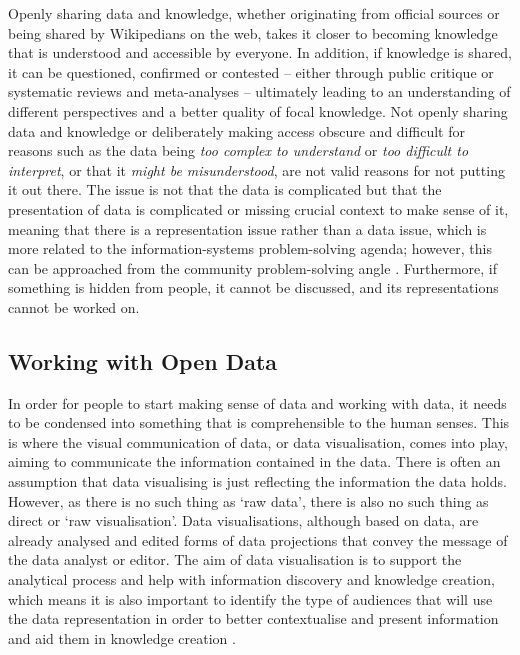 \noindent
Openly sharing data and knowledge, whether originating from official sources or being shared by Wikipedians on the web, takes it closer to becoming knowledge that is understood and accessible by everyone. In addition, if knowledge is shared, it can be questioned, confirmed or contested -- either through public critique or systematic reviews and meta-analyses -- ultimately leading to an understanding of different perspectives and a better quality of focal knowledge. Not openly sharing data and knowledge or deliberately making access obscure and difficult for reasons such as the data being \textit{too complex to understand} or \textit{too difficult to interpret}, or that it \textit{might be misunderstood}, are not valid reasons for not putting it out there. The issue is not that the data is complicated but that the presentation of data is complicated or missing crucial context to make sense of it, meaning that there is a representation issue rather than a data issue, which is more related to the information-systems problem-solving agenda; however, this can be approached from the community problem-solving angle \citep{stillman_community_2009}. Furthermore, if something is hidden from people, it cannot be discussed, and its representations cannot be worked on.

\subsection{Working with Open Data}
\label{sub:data-viz}
In order for people to start making sense of data and working with data, it needs to be condensed into something that is comprehensible to the human senses. This is where the visual communication of data, or data visualisation, comes into play, aiming to communicate the information contained in the data. There is often an assumption that data visualising is just reflecting the information the data holds. However, as there is no such thing as `raw data', there is also no such thing as direct or `raw visualisation'. Data visualisations, although based on data, are already analysed and edited forms of data projections that convey the message of the data analyst or editor. The aim of data visualisation is to support the analytical process and help with information discovery and knowledge creation, which means it is also important to identify the type of audiences that will use the data representation in order to better contextualise and present information and aid them in knowledge creation \citep{chi_operator_1998}.

